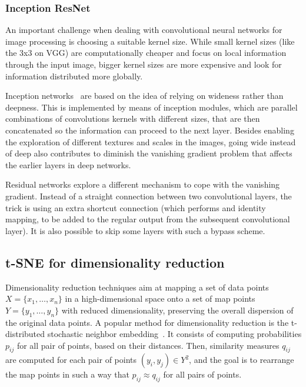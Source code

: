\documentclass[sn-basic]{sn-jnl}%
\theoremstyle{thmstyleone}%
\theoremstyle{thmstyletwo}%
\theoremstyle{thmstylethree}%
\begin{document}
\subsubsection{Inception ResNet}
An important challenge when dealing with convolutional neural networks for image processing is choosing a suitable kernel size. While small kernel sizes (like the 3x3 on VGG) are computationally cheaper and focus on local information through the input image, bigger kernel sizes are more expensive and look for information distributed more globally. 

Inception networks~\citep{inception-paper} are based on the idea of relying on wideness rather than deepness. This is implemented by means of inception modules, which are parallel combinations of convolutions kernels with different sizes, that are then concatenated so the information can proceed to the next layer. Besides enabling the exploration of different textures and scales in the images, going wide instead of deep also contributes to diminish the vanishing gradient problem that affects the earlier layers in deep networks.

Residual networks explore a different mechanism to cope with the vanishing gradient. Instead of a straight connection between two convolutional layers, the trick is using an extra shortcut connection (which performs and identity mapping, to be added to the regular output from the subsequent convolutional layer). It is also possible to skip some layers with such a bypass scheme.


\subsection{t-SNE for dimensionality reduction}

Dimensionality reduction techniques aim at mapping a set of data points $X = \{x_1, \ldots, x_n\}$ in a high-dimensional space onto a set of map points $Y = \{y_1, \ldots, y_n\}$ with reduced dimensionality, preserving the overall dispersion of the original data points. A popular method for dimensionality reduction is the t-distributed stochastic neighbor embedding~\citep{tsne-paper}. It consists of computing probabilities $p_{ij}$ for all pair of points, based on their distances. Then, similarity measures $q_{ij}$ are computed for each pair of points $(y_i, y_j) \in Y^2$, and the goal is to rearrange the map points in such a way that $p_{ij} \approx q_{ij}$ for all pairs of points.
\end{document}
